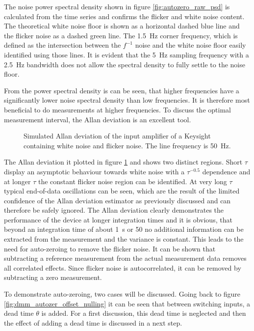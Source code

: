 The noise power spectral density shown in figure \ref{fig:autozero_raw_psd} is calculated from the time series and confirms the flicker and white noise content. The theoretical white noise floor is shown as a horizontal dashed blue line and the flicker noise as a dashed green line. The \qty{1.5}{\Hz} corner frequency, which is defined as the intersection between the $f^{-1}$ noise and the white noise floor easily identified using those lines. It is evident that the \qty{5}{\Hz} sampling frequency with a \qty{2.5}{\Hz} bandwidth does not allow the spectral density to fully settle to the noise floor.

From the power spectral density is can be seen, that higher frequencies have a significantly lower noise spectral density than low frequencies. It is therefore most beneficial to do measurements at higher frequencies. To discuss the optimal measurement interval, the Allan deviation is an excellent tool.

\begin{figure}[ht]
    \centering
    
    \caption{Simulated Allan deviation of the input amplifier of a Keysight  containing white noise and flicker noise. The line frequency is \qty{50}{\Hz}.}
    \label{fig:autozero_raw_adev}
\end{figure}

The Allan deviation it plotted in figure \ref{fig:autozero_raw_adev} and shows two distinct regions. Short $\tau$ display an asymptotic behaviour towards white noise with a $\tau^{−0.5}$ dependence and at longer $\tau$ the constant flicker noise region can be identified. At very long $\tau$ typical end-of-data oscillations can be seen, which are the result of the limited confidence of the Allan deviation estimator as previously discussed and can therefore be safely ignored. The Allan deviation clearly demonstrates the performance of the device at longer integration times and it is obvious, that beyond an integration time of about \qty{1}{\second} or \qty{50}{\plc} no additional information can be extracted from the measurement and the variance is constant. This leads to the need for auto-zeroing to remove the flicker noise. It can be shown \cite{autozero_with_dead_time} that subtracting a reference measurement from the actual measurement data removes all correlated effects. Since flicker noise is autocorrelated, it can be removed by subtracting a zero measurement.

To demonstrate auto-zeroing, two cases will be discussed. Going back to figure \ref{fig:dmm_autozer_offset_nulling} it can be seen that between switching inputs, a dead time $\theta$ is added. For a first discussion, this dead time is neglected and then the effect of adding a dead time is discussed in a next step.

